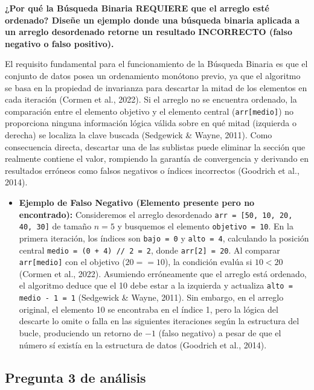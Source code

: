 \documentclass[12pt,a4paper]{article}
\begin{document}
\textbf{¿Por qué la Búsqueda Binaria REQUIERE que el arreglo esté ordenado? Diseñe un ejemplo
donde una búsqueda binaria aplicada a un arreglo desordenado retorne un resultado INCORRECTO
(falso negativo o falso positivo).}

El requisito fundamental para el funcionamiento de la Búsqueda Binaria es que el conjunto de
datos posea un ordenamiento monótono previo, ya que el algoritmo se basa en la propiedad de
invarianza para descartar la mitad de los elementos en cada iteración (Cormen et al., 2022).
Si el arreglo no se encuentra ordenado, la comparación entre el elemento objetivo y el elemento
central (\texttt{arr[medio]}) no proporciona ninguna información lógica válida sobre en qué
mitad (izquierda o derecha) se localiza la clave buscada (Sedgewick \& Wayne, 2011). Como
consecuencia directa, descartar una de las sublistas puede eliminar la sección que realmente
contiene el valor, rompiendo la garantía de convergencia y derivando en resultados erróneos
como falsos negativos o índices incorrectos (Goodrich et al., 2014).

\begin{itemize}[leftmargin=*]
    \item \textbf{Ejemplo de Falso Negativo (Elemento presente pero no encontrado):}
    Consideremos el arreglo desordenado \texttt{arr = [50, 10, 20, 40, 30]} de tamaño $n = 5$
    y busquemos el elemento \texttt{objetivo = 10}. En la primera iteración, los índices son
    \texttt{bajo = 0} y \texttt{alto = 4}, calculando la posición central
    \texttt{medio = (0 + 4) // 2 = 2}, donde \texttt{arr[2] = 20}. Al comparar
    \texttt{arr[medio]} con el objetivo ($20 == 10$), la condición evalúa si $10 < 20$
    (Cormen et al., 2022). Asumiendo erróneamente que el arreglo está ordenado, el algoritmo
    deduce que el 10 debe estar a la izquierda y actualiza \texttt{alto = medio - 1 = 1}
    (Sedgewick \& Wayne, 2011). Sin embargo, en el arreglo original, el elemento 10 se
    encontraba en el índice 1, pero la lógica del descarte lo omite o falla en las siguientes
    iteraciones según la estructura del bucle, produciendo un retorno de $-1$ (falso negativo)
    a pesar de que el número sí existía en la estructura de datos (Goodrich et al., 2014).
\end{itemize}

\subsection*{Pregunta 3 de análisis}
\end{document}
